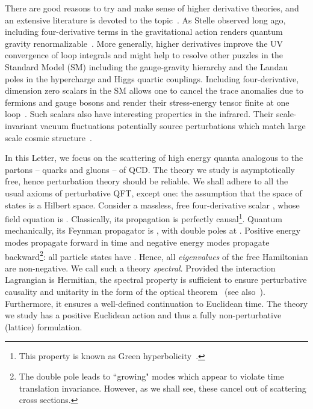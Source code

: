 \documentclass[pra,aps,amsmath,amssymb,notitlepage, twocolumn,superscriptaddress,longbibliography,nofootinbib,floatfix,10pt]{revtex4-2}
\makeatletter
\newcounter{mathrecordid}
\newcommand{\mathboxbegin}[1]{%
  \stepcounter{mathrecordid}%
  \immediate\write\mathrecords{\themathrecordid,#1}%
  \special{pdf:bann << /Type /Annot /Subtype /Link /Border [0 0 0]
    /MathBoxID \themathrecordid /F 2
    /A << /S /URI /URI (urn:mathbox:\themathrecordid) >> >>}}
\newcommand{\mathboxinlineplain}[1]{$#1$}
\newcommand{\mathboxinline}[1]{%
  $\mathboxbegin{inline}%
  \special{pdf:literal direct /MathBoxBegin\themathrecordid\space MP}%
  #1\special{pdf:literal direct /MathBoxEnd\themathrecordid\space MP}%
  \special{pdf:eann}$}
\newcommand{\recordmath}{%
  \ifmeasuring@\expandafter\mathboxinlineplain
  \else\expandafter\mathboxinline\fi}
\makeatother
\begin{document}
There are good reasons to try and make sense of higher derivative theories, and an extensive literature is devoted to the topic~\cite{Flato:1981iy,*Binegar:1984pb,*binegar1982state,Hawking:2001yt,Rivelles_2003,Bender:2008zz,Mostafazadeh_2010_PU,Mannheim:2011ds,maldacena2011einstein,ErrastiDiez:2024hfq,fring2026spectrumgeneratingalgebraintertwinersresonant}.  As Stelle observed long ago, including four-derivative terms in the gravitational action renders quantum gravity renormalizable~\cite{Stelle:1976gc}. 
More generally, higher derivatives improve the UV convergence of loop integrals and might help to resolve other puzzles in the Standard Model (SM) including the gauge-gravity hierarchy and the Landau poles in the hypercharge and Higgs quartic couplings.  Including four-derivative, dimension zero scalars in the SM allows one to cancel the trace anomalies due to fermions and gauge bosons and render their stress-energy tensor finite at one loop~\cite{Boyle:2021jaz,Boyle:2025bxf}. Such scalars also have interesting properties in the infrared. Their scale-invariant vacuum fluctuations potentially source perturbations which match large scale cosmic structure~\cite{Turok:2023amx}. 

In this Letter, we focus on the scattering of high energy quanta analogous to the partons -- quarks and gluons -- of QCD. The theory we study is asymptotically free, hence perturbation theory should be reliable. We shall adhere to all the usual axioms of perturbative QFT, except one: the assumption that the space of states is a Hilbert space. Consider a massless, free four-derivative scalar \recordmath{\phi}, whose field equation is \recordmath{\square^2 \phi=0}. Classically, its propagation is perfectly causal\footnote{This property is known as  Green hyperbolicity~\cite{bar2015green}.}. Quantum mechanically, its Feynman propagator is \recordmath{-i/(p^2+i \epsilon)^2}, with double poles at \recordmath{p^0=\pm (|\mathbf{p}|-i \epsilon)}. Positive energy modes propagate forward in time and negative energy modes propagate backward\footnote{The double pole leads to ``growing" modes which appear to violate time translation invariance. However, as we shall see, these cancel out of scattering cross sections.}: all particle states have \recordmath{p^0>0}. Hence, all {\it eigenvalues} of the free Hamiltonian are non-negative. We call such a theory {\it spectral}. Provided the interaction Lagrangian is Hermitian, the spectral property is sufficient to ensure perturbative causality and unitarity in the form of the optical theorem~\cite{tHooft:186259} (see also~\cite{BTlong}). Furthermore, it ensures a well-defined continuation to Euclidean time. The theory we study has a positive Euclidean action and thus a fully non-perturbative (lattice) formulation.
\end{document}
